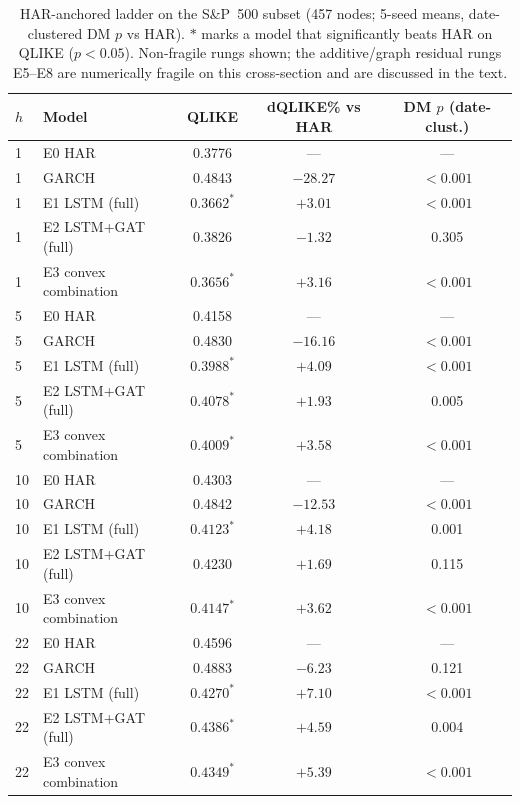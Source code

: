 \documentclass[runningheads]{llncs}
\begin{document}
\begin{table}[t]
\centering
\caption{HAR-anchored ladder on the S\&P~500 subset (457 nodes; 5-seed means, date-clustered DM $p$ vs HAR).
$*$ marks a model that significantly beats HAR on QLIKE ($p<0.05$). Non-fragile rungs shown; the additive/graph
residual rungs E5--E8 are numerically fragile on this cross-section and are discussed in the text.}
\label{tab:haranchor-sp500}
\footnotesize
\setlength{\tabcolsep}{4pt}
\renewcommand{\arraystretch}{0.92}
\begin{tabular}{llccc}
\toprule
$h$ & Model & QLIKE & dQLIKE\% vs HAR & DM $p$ (date-clust.) \\
\midrule
1  & E0 HAR                 & 0.3776 & ---     & --- \\
1  & GARCH                  & 0.4843 & $-28.27$ & $<0.001$ \\
1  & E1 LSTM (full)         & $0.3662^{*}$ & $+3.01$  & $<0.001$ \\
1  & E2 LSTM+GAT (full)     & 0.3826 & $-1.32$  & 0.305 \\
1  & E3 convex combination  & $0.3656^{*}$ & $+3.16$  & $<0.001$ \\
\midrule
5  & E0 HAR                 & 0.4158 & ---     & --- \\
5  & GARCH                  & 0.4830 & $-16.16$ & $<0.001$ \\
5  & E1 LSTM (full)         & $0.3988^{*}$ & $+4.09$  & $<0.001$ \\
5  & E2 LSTM+GAT (full)     & $0.4078^{*}$ & $+1.93$  & 0.005 \\
5  & E3 convex combination  & $0.4009^{*}$ & $+3.58$  & $<0.001$ \\
\midrule
10 & E0 HAR                 & 0.4303 & ---     & --- \\
10 & GARCH                  & 0.4842 & $-12.53$ & $<0.001$ \\
10 & E1 LSTM (full)         & $0.4123^{*}$ & $+4.18$  & 0.001 \\
10 & E2 LSTM+GAT (full)     & 0.4230 & $+1.69$  & 0.115 \\
10 & E3 convex combination  & $0.4147^{*}$ & $+3.62$  & $<0.001$ \\
\midrule
22 & E0 HAR                 & 0.4596 & ---     & --- \\
22 & GARCH                  & 0.4883 & $-6.23$  & 0.121 \\
22 & E1 LSTM (full)         & $0.4270^{*}$ & $+7.10$  & $<0.001$ \\
22 & E2 LSTM+GAT (full)     & $0.4386^{*}$ & $+4.59$  & 0.004 \\
22 & E3 convex combination  & $0.4349^{*}$ & $+5.39$  & $<0.001$ \\
\bottomrule
\end{tabular}
\end{table}
\end{document}
